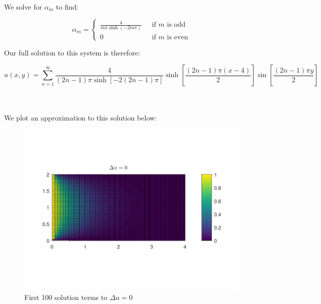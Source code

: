 \begin{solution}
  We solve for $\alpha_m$ to find:

  $$
  \alpha_m = \begin{cases}
    \frac{4}{m \pi \sinh(-2m \pi)} &\; \text{ if } m \text{ is odd} \\
    0               &\; \text{ if } m \text{ is even}
  \end{cases}
  $$

  Our full solution to this system is therefore:

  $$
  u(x, y) = \sum\limits_{n=1}^{\infty} \frac{4}{(2n - 1) \pi \sinh{\left[-2(2n - 1) \pi\right]}} \sinh{\left[ \frac{(2n - 1) \pi (x - 4)}{2} \right]} \sin{\left[\frac{(2n - 1) \pi y}{2}\right]}
  $$

  \ \\\\
  We plot an approximation to this solution below:

  \begin{figure}[h]
    \centering
    \includegraphics[width=\textwidth]{problem_1.png}
    \caption{First 100 solution terms to $\Delta u = 0$}
  \end{figure}

  \ \\
\end{solution}